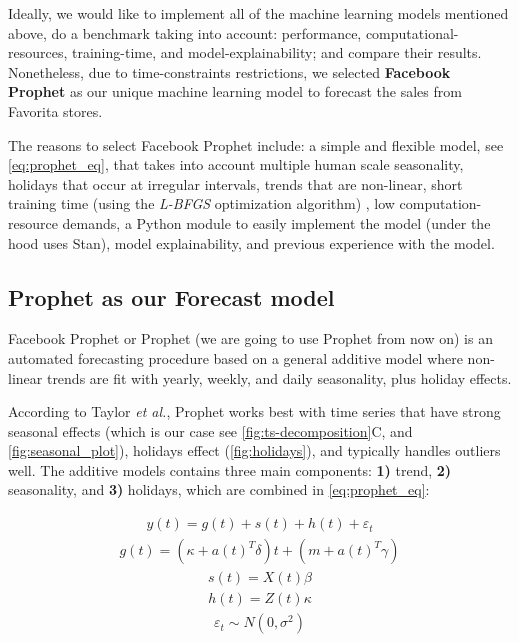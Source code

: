 Ideally, we would like to implement all of the  machine learning models mentioned above, do a benchmark taking into account: performance, computational-resources, training-time, and model-explainability; and compare their results. Nonetheless, due to time-constraints restrictions, we selected \textbf{Facebook Prophet} as our unique machine learning model to forecast the sales from Favorita stores.

 The reasons to select Facebook Prophet include: a simple and flexible model, see \autoref{eq:prophet_eq}, that takes into account multiple human scale seasonality, holidays that occur at irregular intervals, trends that are non-linear, short training time (using the \textit{L-BFGS}  optimization algorithm) , low computation-resource demands, a Python module to easily implement the model (under the hood uses Stan), model explainability, and previous experience with the model. 


\subsection[Prophet as our Forecast model]{Prophet as our Forecast model}
\label{sec:forecast_model}

Facebook Prophet or Prophet (we are going to use Prophet from now on) is an automated forecasting procedure based on a general additive model where non-linear trends are fit with yearly, weekly, and daily seasonality, plus holiday effects.

According to Taylor \textit{et al.}, Prophet works best with time series that have strong seasonal effects (which is our case see \autoref{fig:ts-decomposition}C, and \autoref{fig:seasonal_plot}), holidays effect (\autoref{fig:holidays}), and typically handles outliers well. The additive models contains three main components: \textbf{1)} trend, \textbf{2)} seasonality, and \textbf{3)} holidays, which are combined in \autoref{eq:prophet_eq}:

\begin{align}\label{eq:prophet_eq}
y(t)= g(t) + s(t) + h(t) + \varepsilon_t  
\end{align}
\begin{align}\label{eq:trend_eq}
g(t)= (\kappa + a(t)^T\delta)t + (m + a(t)^T\gamma)
\end{align}  
\begin{align}\label{eq:seasonal_eq}
s(t)= X(t)\beta
\end{align}
\begin{align}\label{eq:holiday_eq}
h(t)= Z(t)\kappa
\end{align}
\begin{align}
\varepsilon_t \sim N(0,\sigma^2)
\end{align}
  
